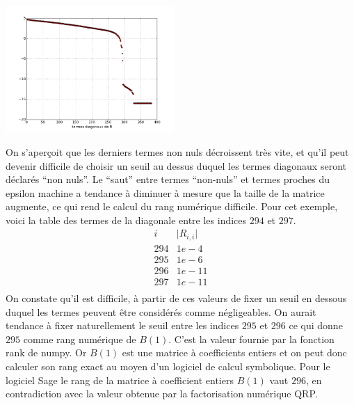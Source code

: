 \documentclass{standalone}
\begin{document}
  \begin{center}
    \includegraphics[width=0.48\textwidth]{../png/diagR.png}
  \end{center}
 On s'aperçoit que les derniers termes non nuls décroissent très vite, et qu'il peut devenir difficile de choisir un seuil au dessus duquel les termes diagonaux seront déclarés ``non nuls''. Le ``saut'' entre termes ``non-nuls'' et termes proches du epsilon machine a tendance à diminuer à mesure que la taille de la matrice augmente, ce qui rend le calcul du rang numérique difficile. Pour cet exemple, voici la table des termes de la diagonale entre les indices $294$ et $297$.
 $$
 \begin{array}{c|c}
 	i & \vert R_{i,i}\vert \\
 	\hline
 	294  & 1e-4 \\
 	295 & 1e-6 \\
 	296 & 1e-11 \\
 	297 & 1e-11 \\
 \end{array}
 $$
On constate qu'il est difficile, à partir de ces valeurs de fixer un seuil en dessous duquel les termes peuvent être considérés comme négligeables. On aurait tendance à fixer naturellement le seuil entre les indices $295$ et $296$ ce qui donne $295$ comme rang numérique de $B(1)$. C'est la valeur fournie par la fonction rank de numpy. Or $B(1)$ est une matrice à coefficients entiers et on peut donc calculer son rang exact au moyen d'un logiciel de calcul symbolique. Pour le logiciel Sage le rang de la matrice à coefficient entiers $B(1)$ vaut $296$, en contradiction avec la valeur obtenue par la factorisation numérique QRP.
\end{document}
